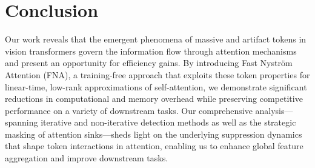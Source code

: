 \documentclass[10pt,twocolumn,letterpaper]{article}
\begin{document}
 \section{Conclusion}
\label{sec:conclusion}
Our work reveals that the emergent phenomena of massive and artifact tokens in vision transformers govern the information flow through attention mechanisms and present an opportunity for efficiency gains. By introducing Fast Nystr\"om Attention (FNA), a training-free approach that exploits these token properties for linear-time, low-rank approximations of self-attention, we demonstrate significant reductions in computational and memory overhead while preserving competitive performance on a variety of downstream tasks. Our comprehensive analysis—spanning iterative and non-iterative detection methods as well as the strategic masking of attention sinks—sheds light on the underlying suppression dynamics that shape token interactions in attention, enabling us to enhance global feature aggregation and improve downstream tasks.
\end{document}
